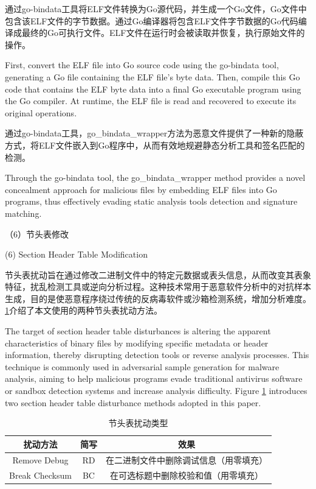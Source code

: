 通过go-bindata工具将ELF文件转换为Go源代码，并生成一个Go文件，Go文件中包含该ELF文件的字节数据。通过Go编译器将包含ELF文件字节数据的Go代码编译成最终的Go可执行文件。ELF文件在运行时会被读取并恢复，执行原始文件的操作。

First, convert the ELF file into Go source code using the go-bindata tool, generating a Go file containing the ELF file's byte data. Then, compile this Go code that contains the ELF byte data into a final Go executable program using the Go compiler. At runtime, the ELF file is read and recovered to execute its original operations.

通过go-bindata工具，go\_bindata\_wrapper方法为恶意文件提供了一种新的隐蔽方式，将ELF文件嵌入到Go程序中，从而有效地规避静态分析工具和签名匹配的检测。

Through the go-bindata tool, the go\_bindata\_wrapper method provides a novel concealment approach for malicious files by embedding ELF files into Go programs, thus effectively evading static analysis tools detection and signature matching.

（6）节头表修改

(6) Section Header Table Modification

节头表扰动旨在通过修改二进制文件中的特定元数据或表头信息，从而改变其表象特征，扰乱检测工具或逆向分析过程。这种技术常用于恶意软件分析中的对抗样本生成，目的是使恶意程序绕过传统的反病毒软件或沙箱检测系统，增加分析难度。\ref{tab:4.5}介绍了本文使用的两种节头表扰动方法。

The target of section header table disturbances is altering the apparent characteristics of binary files by modifying specific metadata or header information, thereby disrupting detection tools or reverse analysis processes. This technique is commonly used in adversarial sample generation for malware analysis, aiming to help malicious programs evade traditional antivirus software or sandbox detection systems and increase analysis difficulty. Figure \ref{tab:4.5} introduces two section header table disturbance methods adopted in this paper.

\begin{table}[htbp]
	\centering
	\caption{节头表扰动类型}\label{tab:4.5}
	\begin{tabular*}{0.9\textwidth}{@{\extracolsep{\fill}}ccc}
		\toprule
		扰动方法 & 简写 & 效果 \\
		\midrule
		Remove Debug & RD & 在二进制文件中删除调试信息（用零填充） \\
		Break Checksum & BC & 在可选标题中删除校验和值（用零填充） \\
		\bottomrule
	\end{tabular*}
\end{table}

